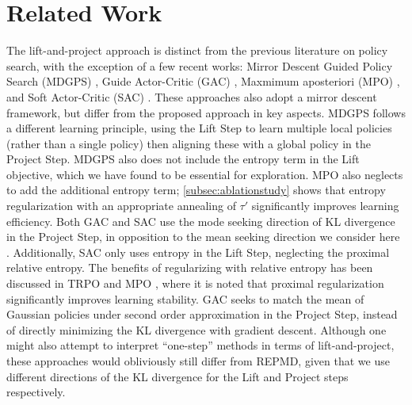
\section{Related Work}
\label{sec:related_work}

The lift-and-project approach is distinct from the previous literature on policy
search, with the exception of a few recent works:
Mirror Descent Guided Policy Search (MDGPS) \citep{montgomery2016guided},
Guide Actor-Critic (GAC) \citep{tangkaratt2017guide},
Maxmimum aposteriori (MPO) \citep{abdolmaleki2018maximum},
and Soft Actor-Critic (SAC) \citep{haarnoja2018soft}.
These approaches also adopt a mirror descent framework,
but differ from the proposed approach in key aspects.
%
MDGPS \citep{montgomery2016guided} follows a different learning principle,
using the Lift Step to learn multiple local policies 
(rather than a single policy)
then aligning these with a global policy in the Project Step.
MDGPS also does not include the entropy term in the Lift objective,
which we have found to be essential for exploration. 
%
MPO \citep{abdolmaleki2018maximum} also neglects to add the additional entropy 
term;
\cref{subsec:ablationstudy} shows that entropy regularization with an
appropriate annealing of $\tau'$ significantly improves learning efficiency.
%
Both GAC and SAC use the mode seeking direction of KL divergence in
the Project Step, in opposition to the mean seeking direction
we consider here \citep{tangkaratt2017guide,haarnoja2018soft}. 
Additionally, SAC only uses entropy
in the Lift Step, neglecting the proximal relative entropy.
The benefits of regularizing with relative entropy
has been discussed in TRPO \citep{schulman2015trust}
and MPO \citep{abdolmaleki2018maximum},
where it is noted that proximal regularization
significantly improves learning stability.
GAC seeks to match the mean of Gaussian policies under second order approximation in the Project Step,
instead of directly minimizing the KL divergence with gradient descent.
%
Although one might also attempt to interpret ``one-step'' methods
in terms of lift-and-project,
these approaches would obliviously still differ from REPMD,
given that we use different directions of the KL divergence
for the Lift and Project steps respectively. 

